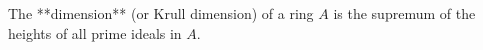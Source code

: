 The **dimension** (or Krull dimension) of a ring $A$ is the supremum of the heights of all prime ideals in $A$.
